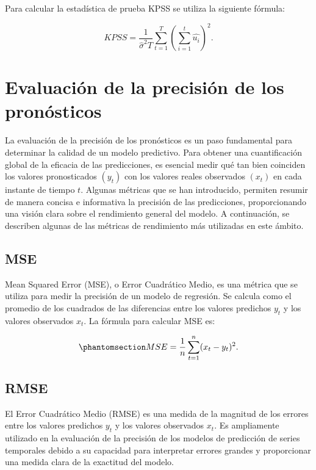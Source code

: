 \documentclass[
  us-letterpaper,
]{scrreprt}
\theoremstyle{plain}
\theoremstyle{definition}
\theoremstyle{definition}
\theoremstyle{remark}
\begin{document}
Para calcular la estadística de prueba KPSS se utiliza la siguiente
fórmula:

\[ KPSS = \dfrac{1}{ \hat{\sigma}^2 T } \sum_{t=1}^T \left(    \sum_{i = 1}^t  \hat{u_i}   \right)^2.\]

\section{Evaluación de la precisión de los
pronósticos}\label{evaluaciuxf3n-de-la-precisiuxf3n-de-los-pronuxf3sticos}

La evaluación de la precisión de los pronósticos es un paso fundamental
para determinar la calidad de un modelo predictivo. Para obtener una
cuantificación global de la eficacia de las predicciones, es esencial
medir qué tan bien coinciden los valores pronosticados \((y_t)\) con los
valores reales observados \((x_t)\) en cada instante de tiempo \(t\).
Algunas métricas que se han introducido, permiten resumir de manera
concisa e informativa la precisión de las predicciones, proporcionando
una visión clara sobre el rendimiento general del modelo. A
continuación, se describen algunas de las métricas de rendimiento más
utilizadas en este ámbito.

\subsection{MSE}\label{sec-MSE}

Mean Squared Error (MSE), o Error Cuadrático Medio, es una métrica que
se utiliza para medir la precisión de un modelo de regresión. Se calcula
como el promedio de los cuadrados de las diferencias entre los valores
predichos \(y_t\) y los valores observados \(x_t\). La fórmula para
calcular MSE es:

\begin{equation}\phantomsection\label{eq-fmse}{
MSE = \frac{1}{n} \sum_{t=1}^{n} (x_t - y_t)^2.
}\end{equation}

\subsection{RMSE}\label{sec-RMSE}

El Error Cuadrático Medio (RMSE) es una medida de la magnitud de los
errores entre los valores predichos \(y_t\) y los valores observados
\(x_t\). Es ampliamente utilizado en la evaluación de la precisión de
los modelos de predicción de series temporales debido a su capacidad
para interpretar errores grandes y proporcionar una medida clara de la
exactitud del modelo.
\end{document}
